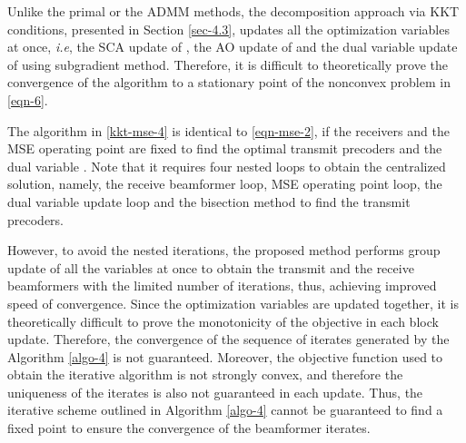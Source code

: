 Unlike the primal or the \ac{ADMM} methods, the decomposition approach via \ac{KKT} conditions, presented in Section \ref{sec-4.3}, updates all the optimization variables at once, \textit{i.e}, the \ac{SCA} update of , the \ac{AO} update of  and the dual variable update of \me{\alpha} using subgradient method. Therefore, it is difficult to theoretically prove the convergence of the algorithm to a stationary point of the nonconvex problem in \eqref{eqn-6}.

The algorithm in \eqref{kkt-mse-4} is identical to \eqref{eqn-mse-2}, if the receivers  and the \ac{MSE} operating point  are fixed to find the optimal transmit precoders  and the dual variable . Note that it requires four nested loops to obtain the centralized solution, namely, the receive beamformer loop, \ac{MSE} operating point loop, the dual variable update loop and the bisection method to find the transmit precoders. 

However, to avoid the nested iterations, the proposed method performs group update of all the variables at once to obtain the transmit and the receive beamformers with the limited number of iterations, thus, achieving improved speed of convergence. Since the optimization variables are updated together, it is theoretically difficult to prove the monotonicity of the objective in each block update. Therefore, the convergence of the sequence of iterates generated by the Algorithm \ref{algo-4} is not guaranteed. Moreover, the objective function used to obtain the iterative algorithm is not strongly convex, and therefore the uniqueness of the iterates is also not guaranteed in each update. Thus, the iterative scheme outlined in Algorithm \ref{algo-4} cannot be guaranteed to find a fixed point to ensure the convergence of the beamformer iterates.

